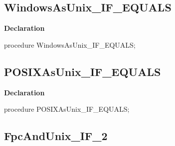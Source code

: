 \documentclass{report}
\newif\ifpdf
\begin{document}
\subsection*{WindowsAsUnix{\_}IF{\_}EQUALS}
\fi
\label{ok_if_expressions-WindowsAsUnix_IF_EQUALS}
\begin{list}{}{
\setlength{\itemindent}{0cm}
\setlength{\listparindent}{0cm}
\setlength{\leftmargin}{\evensidemargin}
\addtolength{\leftmargin}{\tmplength}
\settowidth{\labelsep}{X}
\addtolength{\leftmargin}{\labelsep}
\setlength{\labelwidth}{\tmplength}
}
\item[\textbf{Declaration}\hfill]
\ifpdf
\begin{flushleft}
\fi
\begin{ttfamily}
procedure WindowsAsUnix{\_}IF{\_}EQUALS;\end{ttfamily}

\ifpdf
\end{flushleft}
\fi

\end{list}
\ifpdf
\subsection*{\large{\textbf{POSIXAsUnix{\_}IF{\_}EQUALS}}\normalsize\hspace{1ex}\hrulefill}
\else
\subsection*{POSIXAsUnix{\_}IF{\_}EQUALS}
\fi
\label{ok_if_expressions-POSIXAsUnix_IF_EQUALS}
\begin{list}{}{
\setlength{\itemindent}{0cm}
\setlength{\listparindent}{0cm}
\setlength{\leftmargin}{\evensidemargin}
\addtolength{\leftmargin}{\tmplength}
\settowidth{\labelsep}{X}
\addtolength{\leftmargin}{\labelsep}
\setlength{\labelwidth}{\tmplength}
}
\item[\textbf{Declaration}\hfill]
\ifpdf
\begin{flushleft}
\fi
\begin{ttfamily}
procedure POSIXAsUnix{\_}IF{\_}EQUALS;\end{ttfamily}

\ifpdf
\end{flushleft}
\fi

\end{list}
\ifpdf
\subsection*{\large{\textbf{FpcAndUnix{\_}IF{\_}2}}\normalsize\hspace{1ex}\hrulefill}
\else
\end{document}
